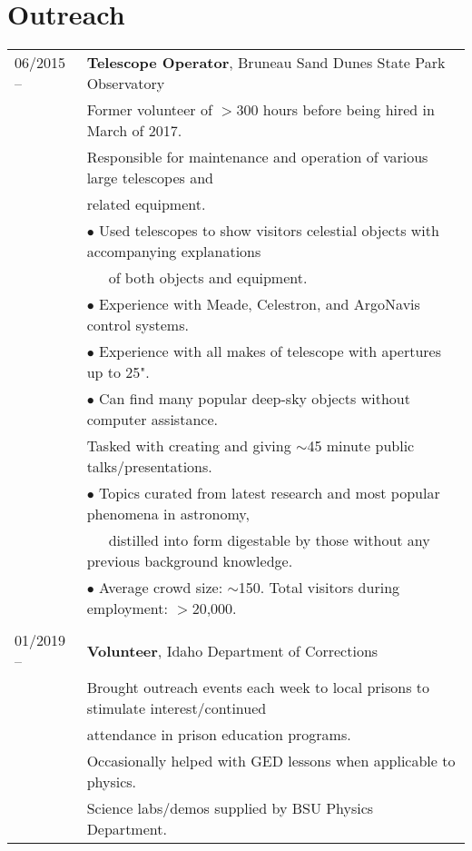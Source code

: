 \documentclass[11pt]{article}
\begin{document}
\section {Outreach}
\begin{tabular}{ll}
06/2015 --    &   \textbf{Telescope Operator}, Bruneau Sand Dunes State Park Observatory \\
      & Former volunteer of $>$300 hours before being hired in March of 2017.\vspace{2mm} \\
      & Responsible for maintenance and operation of various large telescopes and \\
      & related equipment.\\
      & $\bullet$ Used telescopes to show visitors celestial objects with accompanying explanations \\
      & \-\ \-\ \-\ of both objects and equipment.\\
      & $\bullet$ Experience with Meade, Celestron, and ArgoNavis control systems.\\
      & $\bullet$ Experience with all makes of telescope with apertures up to 25".\\
      & $\bullet$ Can find many popular deep-sky objects without computer assistance.\vspace{1mm} \\
      & Tasked with creating and giving $\sim$45 minute public talks/presentations.\\
      & $\bullet$ Topics curated from latest research and most popular phenomena in astronomy, \\
      & \-\ \-\ \-\ distilled into form digestable by those without any previous background knowledge.\\
      & $\bullet$ Average crowd size: $\sim$150. Total visitors during employment: $>$20,000.\\
      & \\
01/2019 --    &   \textbf{Volunteer}, Idaho Department of Corrections \vspace{1mm} \\
      & Brought outreach events each week to local prisons to stimulate interest/continued \\
      & attendance in prison education programs.\\
      & Occasionally helped with GED lessons when applicable to physics.\\
      & Science labs/demos supplied by BSU Physics Department.\vspace{1mm}\\

\end{tabular}
\end{document}
